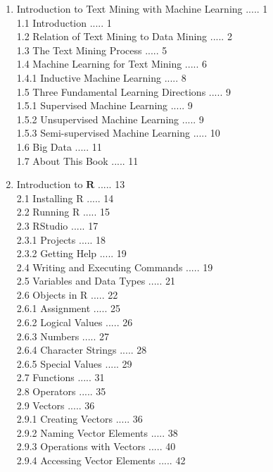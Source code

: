 \documentclass[10pt]{book}
\begin{document}
\begin{enumerate}
  \item Introduction to Text Mining with Machine Learning ..... 1\\
1.1 Introduction ..... 1\\
1.2 Relation of Text Mining to Data Mining ..... 2\\
1.3 The Text Mining Process ..... 5\\
1.4 Machine Learning for Text Mining ..... 6\\
1.4.1 Inductive Machine Learning ..... 8\\
1.5 Three Fundamental Learning Directions ..... 9\\
1.5.1 Supervised Machine Learning ..... 9\\
1.5.2 Unsupervised Machine Learning ..... 9\\
1.5.3 Semi-supervised Machine Learning ..... 10\\
1.6 Big Data ..... 11\\
1.7 About This Book ..... 11
  \item Introduction to $\mathbf{R}$ ..... 13\\
2.1 Installing R ..... 14\\
2.2 Running R ..... 15\\
2.3 RStudio ..... 17\\
2.3.1 Projects ..... 18\\
2.3.2 Getting Help ..... 19\\
2.4 Writing and Executing Commands ..... 19\\
2.5 Variables and Data Types ..... 21\\
2.6 Objects in R ..... 22\\
2.6.1 Assignment ..... 25\\
2.6.2 Logical Values ..... 26\\
2.6.3 Numbers ..... 27\\
2.6.4 Character Strings ..... 28\\
2.6.5 Special Values ..... 29\\
2.7 Functions ..... 31\\
2.8 Operators ..... 35\\
2.9 Vectors ..... 36\\
2.9.1 Creating Vectors ..... 36\\
2.9.2 Naming Vector Elements ..... 38\\
2.9.3 Operations with Vectors ..... 40\\
2.9.4 Accessing Vector Elements ..... 42\\

\end{enumerate}
\end{document}
